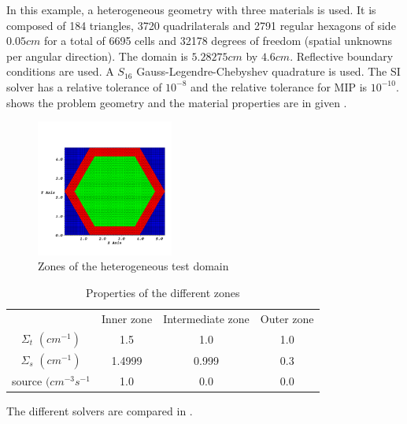 In this example, a heterogeneous geometry with three materials is used. It is 
composed of 184 triangles, 3720 quadrilaterals and 2791 regular hexagons of 
side $0.05cm$ for a total of 6695 cells and 32178 degrees of freedom (spatial 
unknowns per angular direction). The domain is $5.28275cm$ by $4.6cm$. 
Reflective boundary conditions are used. A $S_{16}$ Gauss-Legendre-Chebyshev 
quadrature is used. The SI solver has a relative tolerance of 
$10^{-8}$ and the relative tolerance for MIP is $10^{-10}$. 
shows the problem geometry and the material properties are in given
.
\begin{figure}[H]
  \centering
  \includegraphics[width=0.4\textwidth]{source_crop}
  \caption{Zones of the heterogeneous test domain}
  \label{hex_zones}
\end{figure}
\begin{table}[H]
  \begin{center}
    \caption{Properties of the different zones}
    \begin{tabular}{|c|c|c|c|}
      \hline
       & Inner zone & Intermediate zone & Outer zone \\
      $\Sigma_t$ $(cm^{-1})$ & 1.5 & 1.0 & 1.0 \\
      $\Sigma_s$ $(cm^{-1})$ & 1.4999 & 0.999 & 0.3 \\
     source $(cm^{-3}s^{-1}$ & 1.0 & 0.0 & 0.0 \\
      \hline
    \end{tabular}
    \label{hex_prop}
  \end{center}
\end{table}
The different solvers are compared in .
